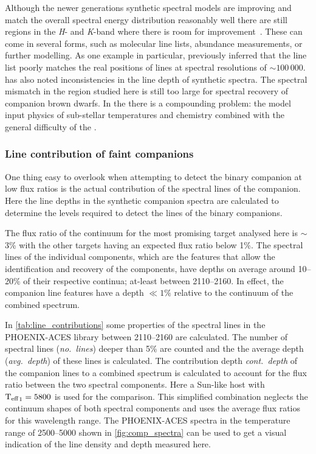
Although the newer generations synthetic spectral models are improving and match the overall spectral energy distribution reasonably well there are still regions in the \emph{H}- and \emph{K}-band where there is room for improvement~\citet{rajpurohit_spectral_2016}.
These can come in several forms, such as molecular line lists, abundance measurements, or further modelling.
As one example in particular, \citet{rajpurohit_spectral_2016} previously inferred that the  line list poorly matches the real positions of  lines at spectral resolutions of \(\sim100\,000\).
\citet{passegger_carmenes_2018} has also noted inconsistencies in the line depth of synthetic spectra.
The spectral mismatch in the region studied here is still too large for spectral recovery of companion brown dwarfs.
In the \nir{} there is a compounding problem: the model input physics of sub-stellar temperatures and chemistry combined with the general difficulty of the \nir{}.

\subsubsection{Line contribution of faint companions}
\label{subsubsec:line_contributions}
One thing easy to overlook when attempting to detect the binary companion at low flux ratios is the actual contribution of the spectral lines of the companion.
Here the line depths in the synthetic companion spectra are calculated to determine the \snr{} levels required to detect the lines of the binary companions.

The flux ratio of the continuum for the most promising target analysed here is \FtwoFone{}\(\sim\)3\% with the other targets having an expected flux ratio below 1\%.
The spectral lines of the individual components, which are the features that allow the identification and recovery of the components, have depths on average around 10--20\% of their respective continua; at-least between 2110--2160\nm{}.
In effect, the companion line features have a depth \(\ll 1\%\) relative to the continuum of the combined spectrum.

In \cref{tab:line_contributions} some properties of the spectral lines in the {PHOENIX-ACES} library between 2110--2160\nm{} are calculated.
The number of spectral lines (\emph{no.~lines}) deeper than 5\% are counted and the the average depth (\emph{avg.~depth}) of these lines is calculated.
The contribution depth \emph{cont.~depth} of the companion lines to a combined spectrum is calculated to account for the flux ratio between the two spectral components.
Here a Sun-like host with \({\textrm{T}_{\mathrm{eff}}}_{1}=5800\)\K{} is used for the comparison.
This simplified combination neglects the continuum shapes of both spectral components and uses the average flux ratios for this wavelength range.
The {PHOENIX-ACES} spectra in the temperature range of 2500--5000\K{} shown in \cref{fig:comp_spectra} can be used to get a visual indication of the line density and depth measured here.

